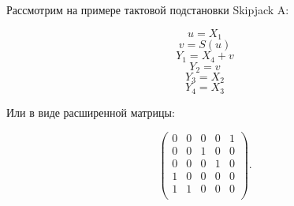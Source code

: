 \documentclass[a4paper,14pt]{extarticle}
\begin{document}
Рассмотрим на примере тактовой подстановки Skipjack A:

$$u = X_1$$
$$v = S(u)$$
$$Y_1 = X_4 + v$$
$$Y_2 = v$$
$$Y_3 = X_2$$
$$Y_4 = X_3$$

Или в виде расширенной матрицы:

$$
\begin{pmatrix}
0 & 0 & 0 & 0 & 1\\
0 & 0 & 1 & 0 & 0\\
0 & 0 & 0 & 1 & 0\\
1 & 0 & 0 & 0 & 0\\
1    & 1    & 0 & 0    & 0\\
\end{pmatrix}.
$$
\end{document}
